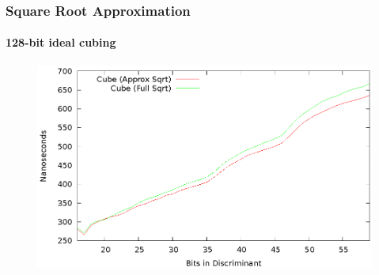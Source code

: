 \documentclass{beamer}
\begin{document}
\begin{frame}
\frametitle{Square Root Approximation}
\framesubtitle{128-bit ideal cubing}
\begin{figure}
\includegraphics[scale=0.86]{cube-sqrtopt-128}
\end{figure}
\end{frame}
\end{document}
